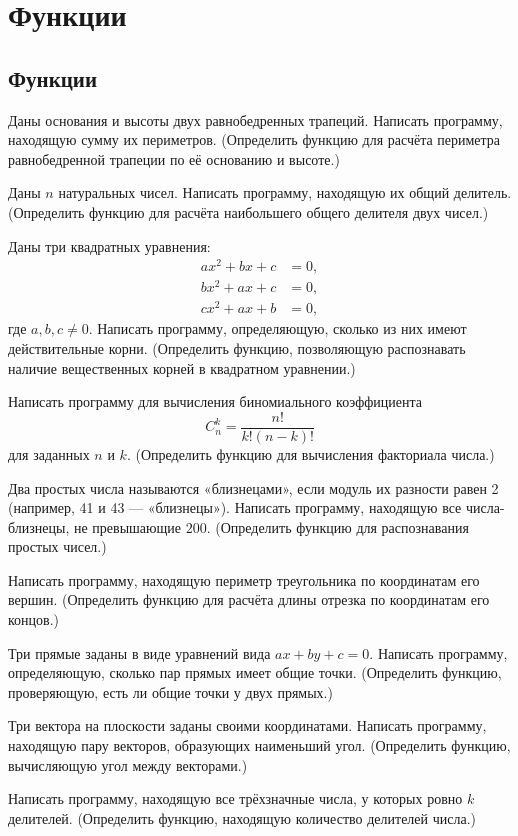 \section{Функции}

\subsection{Функции}

\task Даны основания и высоты двух равнобедренных трапеций. Написать
программу, находящую сумму их периметров. (Определить функцию для
расчёта периметра равнобедренной трапеции по её основанию и высоте.)

\task Даны $n$ натуральных чисел. Написать программу, находящую их
общий делитель. (Определить функцию для расчёта наибольшего общего
делителя двух чисел.)

\task Даны три квадратных уравнения:
\begin{align*}
a x^2 + b x + c &= 0,\\
b x^2 + a x + c &= 0,\\
c x^2 + a x + b &= 0,
\end{align*}
где $a,b,c\neq 0.$
Написать программу, определяющую, сколько из них имеют действительные
корни. (Определить функцию, позволяющую распознавать наличие
вещественных корней в квадратном уравнении.)

\task Написать программу для вычисления биномиального коэффициента
\[
C_n^k = \frac{n!}{k!(n-k)!}
\]
для заданных $n$ и $k.$ (Определить функцию для вычисления факториала
числа.)

\task Два простых числа называются «близнецами», если модуль их
разности равен 2 (например, 41 и 43 — «близнецы»). Написать программу,
находящую все числа-близнецы, не превышающие $200.$ (Определить
функцию для распознавания простых чисел.)

\task Написать программу, находящую периметр треугольника по
координатам его вершин. (Определить функцию для расчёта длины отрезка
по координатам его концов.)

\task Три прямые заданы в виде уравнений вида $ax+by+c=0.$ Написать
программу, определяющую, сколько пар прямых имеет общие
точки. (Определить функцию, проверяющую, есть ли общие точки у двух
прямых.)

\task Три вектора на плоскости заданы своими координатами. Написать
программу, находящую пару векторов, образующих наименьший
угол. (Определить функцию, вычисляющую угол между векторами.)

\task Написать программу, находящую все трёхзначные числа, у которых
ровно $k$ делителей. (Определить функцию, находящую количество
делителей числа.)


